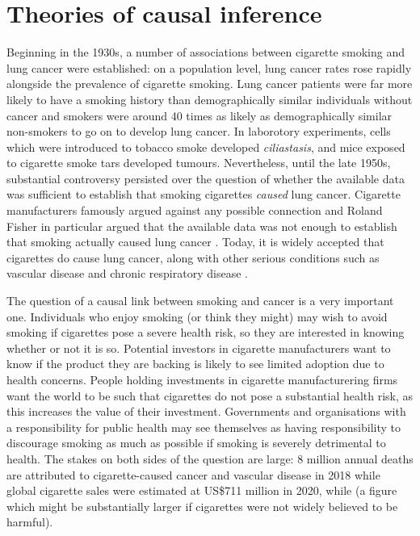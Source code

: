 

\section{Theories of causal inference}

Beginning in the 1930s, a number of associations between cigarette smoking and lung cancer were established: on a population level, lung cancer rates rose rapidly alongside the prevalence of cigarette smoking. Lung cancer patients were far more likely to have a smoking history than demographically similar individuals without cancer and smokers were around 40 times as likely as demographically similar non-smokers to go on to develop lung cancer. In laborotory experiments, cells which were introduced to tobacco smoke developed \emph{ciliastasis}, and mice exposed to cigarette smoke tars developed tumours\citep{proctor_history_2012}. Nevertheless, until the late 1950s, substantial controversy persisted over the question of whether the available data was sufficient to establish that smoking cigarettes \emph{caused} lung cancer. Cigarette manufacturers famously argued against any possible connection \citep{oreskes_merchants_2011} and Roland Fisher in particular argued that the available data was not enough to establish that smoking actually caused lung cancer \citep{fisher_cancer_1958}. Today, it is widely accepted that cigarettes do cause lung cancer, along with other serious conditions such as vascular disease and chronic respiratory disease \citep{world_health_organisation_tobacco_nodate,wiblin_why_2016}.

The question of a causal link between smoking and cancer is a very important one. Individuals who enjoy smoking (or think they might) may wish to avoid smoking if cigarettes pose a severe health risk, so they are interested in knowing whether or not it is so. Potential investors in cigarette manufacturers want to know if the product they are backing is likely to see limited adoption due to health concerns. People holding investments in cigarette manufacturering firms want the world to be such that cigarettes do not pose a substantial health risk, as this increases the value of their investment. Governments and organisations with a responsibility for public health may see themselves as having responsibility to discourage smoking as much as possible if smoking is severely detrimental to health. The stakes on both sides of the question are large: 8 million annual deaths are attributed to cigarette-caused cancer and vascular disease in 2018\citep{world_health_organisation_tobacco_nodate} while  global cigarette sales were estimated at US\$711 million in 2020, while \citep{noauthor_cigarettes_nodate} (a figure which might be substantially larger if cigarettes were not widely believed to be harmful).

